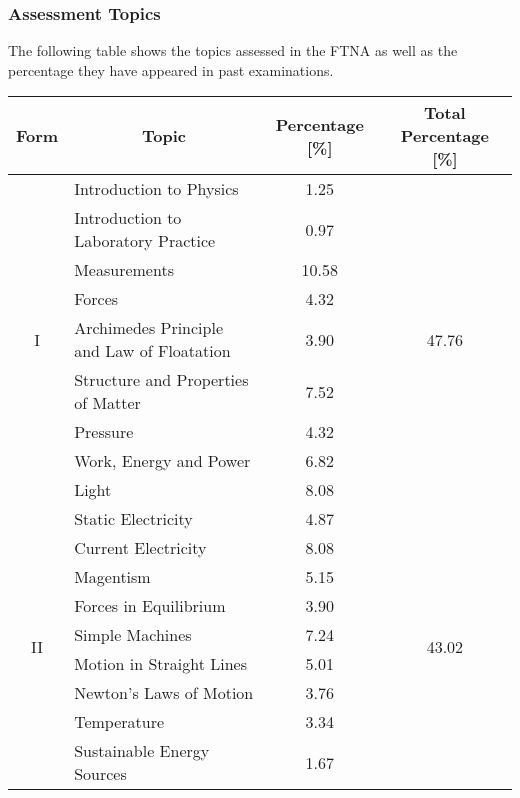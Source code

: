 \subsubsection{Assessment Topics}
\noindent The following table shows the topics assessed in the FTNA as well as the percentage they have appeared in past examinations. 
\begin{center}
	\begin{tabular}{|c|l|c|c|} \hline
		Form & \multicolumn{1}{|c|}{Topic} & Percentage [\%] & Total Percentage [\%] \\ \hline
		\multirow{9}{*}{I} 	& Introduction to Physics 					& 1.25 & \multirow{9}{*}{47.76}	\\ \cline{2-3}
						& Introduction to Laboratory Practice 		& 0.97 & \\ \cline{2-3}
						& Measurements						& 10.58 & \\ \cline{2-3}
						& Forces 								& 4.32 & \\ \cline{2-3}
						& Archimedes Principle and Law of Floatation 	& 3.90 & \\ \cline{2-3}
						& Structure and Properties of Matter 			& 7.52 & \\ \cline{2-3}
						& Pressure							& 4.32 & \\ \cline{2-3}
						& Work, Energy and Power				& 6.82 & \\ \cline{2-3}
						& Light 								& 8.08 & \\ \hline
		\multirow{9}{*}{II} 	& Static Electricity	 					& 4.87 & \multirow{9}{*}{43.02} \\ \cline{2-3}
						& Current Electricity				 		& 8.08 & \\ \cline{2-3}
						& Magentism							& 5.15 & \\ \cline{2-3}
						& Forces in Equilibrium					& 3.90 & \\ \cline{2-3}
						& Simple Machines					 	& 7.24 & \\ \cline{2-3}
						& Motion in Straight Lines		 			& 5.01 & \\ \cline{2-3}
						& Newton's Laws of Motion				& 3.76 & \\ \cline{2-3}
						& Temperature							& 3.34 & \\ \cline{2-3}
						& Sustainable Energy Sources				& 1.67 & \\ \hline
	\end{tabular}
\end{center}


